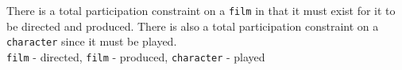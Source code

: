 \begin{parts}
\begin{solution}[\mcq]
    There is a total participation constraint on a \texttt{film} in that
    it must exist for it to be directed and produced. There is also a total
    participation constraint on a \texttt{character} since it must be played.\\
    \texttt{film} - directed, \texttt{film} - produced, 
    \texttt{character} - played
  \end{solution}

\end{parts}

